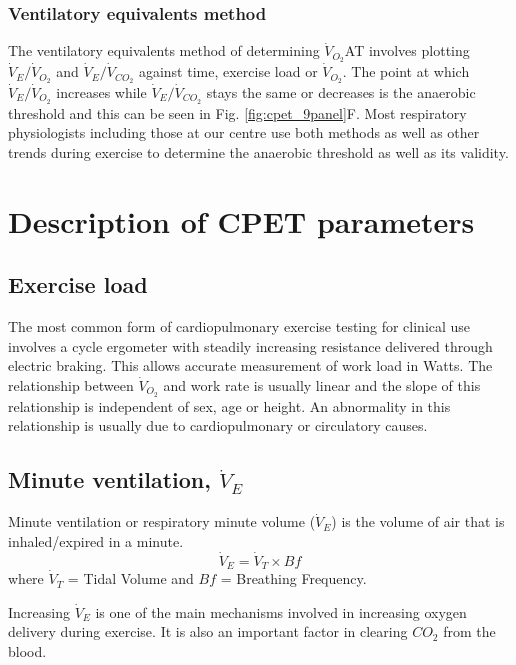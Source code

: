 \subsubsection{Ventilatory equivalents method}
The ventilatory equivalents method of determining $\dot{V}_{O_2}$AT involves plotting $\dot{V}_E/\dot{V}_{O_2}$
and $\dot{V}_E/\dot{V}_{CO_2}$ against time, exercise load or $\dot{V}_{O_2}$. 
The point at which $\dot{V}_E/\dot{V}_{O_2}$ increases while $\dot{V}_E/\dot{V}_{CO_2}$ stays the same or decreases is the anaerobic threshold and this can be seen in Fig. \ref{fig:cpet_9panel}F. 
Most respiratory physiologists including those at our centre use both methods as well as other trends during exercise to determine the anaerobic threshold as well as its validity.


\section{Description of CPET parameters}
\label{sec:cpx_parameters}


\subsection{Exercise load}
The most common form of cardiopulmonary exercise testing for clinical use involves a cycle ergometer with steadily increasing resistance delivered through electric braking. 
This allows accurate measurement of work load in Watts. 
The relationship between $\dot{V}_{O_2}$ and work rate is usually linear and the slope of this relationship is independent of sex, age or height. 
An abnormality in this relationship is usually due to cardiopulmonary or circulatory causes.

\subsection[Minute ventilation]{Minute ventilation, $\dot{V}_E$}
Minute ventilation or respiratory minute volume ($\dot{V}_E$) is the volume of air that is inhaled/expired in a minute.
\begin{equation} \label{eq:VE=VTxBf}
	\dot{V}_E = \dot{V}_T \times Bf
\end{equation}
where $\dot{V}_T$ = Tidal Volume and $Bf$ = Breathing Frequency.

Increasing $\dot{V}_E$ is one of the main mechanisms involved in increasing oxygen delivery during exercise. 
It is also an important factor in clearing $CO_2$ from the blood.

